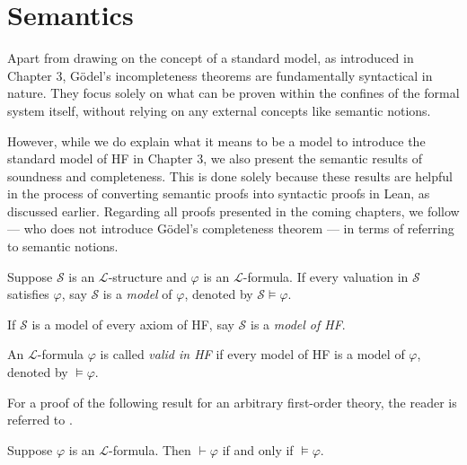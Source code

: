 \section{Semantics}

Apart from drawing on the concept of a standard model, as introduced in Chapter 3, 
Gödel's incompleteness theorems are fundamentally syntactical in nature. 
They focus solely on what can be proven within the confines of the formal system itself, 
without relying on any external concepts like semantic notions.

However, while we do explain what it means to be a model to introduce the standard model of 
HF in Chapter 3, we also present the semantic results of soundness and completeness. 
This is done solely because these results are helpful in the process of converting semantic proofs 
into syntactic proofs in Lean, as discussed earlier.
Regarding all proofs presented in the coming chapters, we follow 
\cite{swierczkowski2003finite} — who does not introduce Gödel's completeness theorem — 
in terms of referring to semantic notions.

\begin{definition}
    \label{def:models+Model+valid}
    \leanok
    Suppose $\mathcal{S}$ is an $\mathcal{L}$-structure and $\varphi$ is an $\mathcal{L}$-formula.
    If every valuation in $\mathcal{S}$ satisfies $\varphi$, 
    say $\mathcal{S}$ is a \textit{model} of $\varphi$, denoted by $\mathcal{S} \vDash \varphi$.

    If $\mathcal{S}$ is a model of every axiom of HF, say $\mathcal{S}$ is a \textit{model of HF}.
    
    An $\mathcal{L}$-formula $\varphi$ is called \textit{valid in HF} if 
    every model of HF is a model of $\varphi$, denoted by $\vDash \varphi$.
\end{definition}

For a proof of the following result for an arbitrary first-order theory, 
the reader is referred to  \cite{shoenfield1967mathematical}.

\begin{theorem}
    \label{thm:completeness}
    \leanok
    Suppose $\varphi$ is an $\mathcal{L}$-formula.
    Then $\vdash \varphi$ if and only if $\vDash \varphi$.
\end{theorem}

